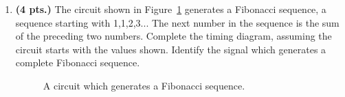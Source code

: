 \begin{enumerate}
\begin{solution} {
\begin{figure}[ht]
\end{figure}
} \end{solution}

\item{\bf (4 pts.)} The circuit shown in Figure~\ref{fig:fib} generates a
Fibonacci sequence, a sequence starting with 1,1,2,3...  The next number in
the sequence is the sum of the preceding two numbers.  Complete the 
timing diagram, assuming the circuit starts with the values shown.
Identify the signal which generates a complete Fibonacci sequence.

\begin{figure}[ht]
\caption{A circuit which generates a Fibonacci sequence.}
\label{fig:fib}
\end{figure}

\end{enumerate}
